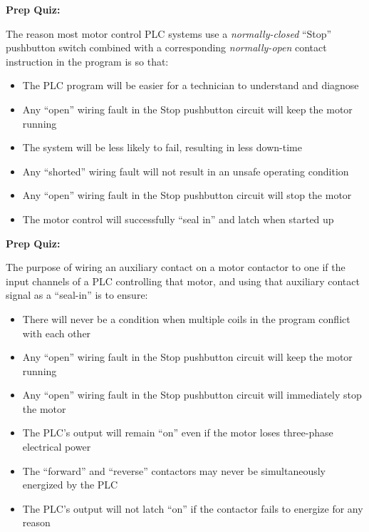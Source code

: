 \vfil \eject

\noindent
{\bf Prep Quiz:}

The reason most motor control PLC systems use a {\it normally-closed} ``Stop'' pushbutton switch combined with a corresponding {\it normally-open} contact instruction in the program is so that:

\begin{itemize}
\item{} The PLC program will be easier for a technician to understand and diagnose
\vskip 5pt 
\item{} Any ``open'' wiring fault in the Stop pushbutton circuit will keep the motor running
\vskip 5pt 
\item{} The system will be less likely to fail, resulting in less down-time
\vskip 5pt 
\item{} Any ``shorted'' wiring fault will not result in an unsafe operating condition
\vskip 5pt 
\item{} Any ``open'' wiring fault in the Stop pushbutton circuit will stop the motor
\vskip 5pt 
\item{} The motor control will successfully ``seal in'' and latch when started up
\end{itemize}







\vfil \eject

\noindent
{\bf Prep Quiz:}

The purpose of wiring an auxiliary contact on a motor contactor to one if the input channels of a PLC controlling that motor, and using that auxiliary contact signal as a ``seal-in'' is to ensure:

\begin{itemize}
\item{} There will never be a condition when multiple coils in the program conflict with each other
\vskip 5pt 
\item{} Any ``open'' wiring fault in the Stop pushbutton circuit will keep the motor running 
\vskip 5pt 
\item{} Any ``open'' wiring fault in the Stop pushbutton circuit will immediately stop the motor
\vskip 5pt 
\item{} The PLC's output will remain ``on'' even if the motor loses three-phase electrical power
\vskip 5pt 
\item{} The ``forward'' and ``reverse'' contactors may never be simultaneously energized by the PLC
\vskip 5pt 
\item{} The PLC's output will not latch ``on'' if the contactor fails to energize for any reason
\end{itemize}








